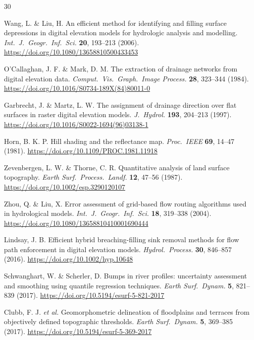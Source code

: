 \documentclass[11pt,a4paper]{article}
\begin{document}
\begin{thebibliography}{30}

Wang, L. \& Liu, H. An efficient method for identifying and filling surface depressions in digital elevation models for hydrologic analysis and modelling.
\textit{Int.\ J.\ Geogr.\ Inf.\ Sci.} \textbf{20}, 193--213 (2006).
\url{https://doi.org/10.1080/13658810500433453}

O'Callaghan, J. F. \& Mark, D. M. The extraction of drainage networks from digital elevation data.
\textit{Comput.\ Vis.\ Graph.\ Image Process.} \textbf{28}, 323--344 (1984).
\url{https://doi.org/10.1016/S0734-189X(84)80011-0}

Garbrecht, J. \& Martz, L. W. The assignment of drainage direction over flat surfaces in raster digital elevation models.
\textit{J.\ Hydrol.} \textbf{193}, 204--213 (1997).
\url{https://doi.org/10.1016/S0022-1694(96)03138-1}

Horn, B. K. P. Hill shading and the reflectance map.
\textit{Proc.\ IEEE} \textbf{69}, 14--47 (1981).
\url{https://doi.org/10.1109/PROC.1981.11918}

Zevenbergen, L. W. \& Thorne, C. R. Quantitative analysis of land surface topography.
\textit{Earth Surf.\ Process.\ Landf.} \textbf{12}, 47--56 (1987).
\url{https://doi.org/10.1002/esp.3290120107}

Zhou, Q. \& Liu, X. Error assessment of grid-based flow routing algorithms used in hydrological models.
\textit{Int.\ J.\ Geogr.\ Inf.\ Sci.} \textbf{18}, 319--338 (2004).
\url{https://doi.org/10.1080/13658810410001690444}

Lindsay, J. B. Efficient hybrid breaching-filling sink removal methods for flow path enforcement in digital elevation models.
\textit{Hydrol.\ Process.} \textbf{30}, 846--857 (2016).
\url{https://doi.org/10.1002/hyp.10648}

Schwanghart, W. \& Scherler, D. Bumps in river profiles: uncertainty assessment and smoothing using quantile regression techniques.
\textit{Earth Surf.\ Dynam.} \textbf{5}, 821--839 (2017).
\url{https://doi.org/10.5194/esurf-5-821-2017}

Clubb, F. J. \textit{et al.} Geomorphometric delineation of floodplains and terraces from objectively defined topographic thresholds.
\textit{Earth Surf.\ Dynam.} \textbf{5}, 369--385 (2017).
\url{https://doi.org/10.5194/esurf-5-369-2017}


\end{thebibliography}
\end{document}
